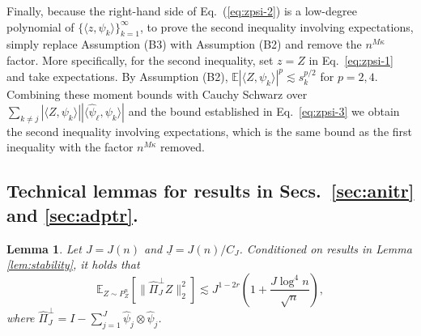 \documentclass[aos]{imsart}
\renewcommand{\hat}{\widehat}
\newcommand{\und}{\underline}
\newcommand{\pd}[1]{%
	{ \color{blue} PD: #1}%
}
\theoremstyle{plain}
\newtheorem{lemma}{Lemma}[section]
\theoremstyle{definition}
\theoremstyle{definition}
\begin{document}
\begin{appendix}
Finally, because the right-hand side of Eq.~(\ref{eq:zpsi-2}) is a low-degree polynomial of $\{\langle z,\psi_k\rangle\}_{k=1}^{\infty}$,
to prove the second inequality involving expectations, simply replace Assumption (B3) with Assumption (B2) and remove the $n^{M\kappa}$ factor. 
More specifically, {for the second inequality, set $z = Z$ in Eq.~\eqref{eq:zpsi-1} and take expectations. By Assumption (B2), $\mathbb{E}\left| \langle Z, \psi_k \rangle \right|^p \lesssim s^{p/2}_k$ for $p=2,4$. Combining these moment bounds with Cauchy Schwarz over $\sum_{k \neq j} \left| \langle Z, \psi_k \rangle \right| | \langle \hat\psi_\ell, \psi_k \rangle |$ and the bound established in Eq.~\eqref{eq:zpsi-3} we obtain the second inequality involving expectations, which is the same bound as the first inequality with the factor $n^{M\kappa}$ removed.}


\subsection{Technical lemmas for results in Secs.~\ref{sec:anitr} and \ref{sec:adptr}.}


\begin{lemma}
Let $J=J(n)$ and $\und J=J(n)/C_J$.
Conditioned on results in Lemma \ref{lem:stability}, it holds that
$$
\mathbb E_{Z\sim P_Z^n}[\|\hat\Pi_J^\perp Z\|_2^2] \lesssim J^{1-2r}\left(1+\frac{J\log^4 n}{\sqrt{n}}\right),
$$
where $\hat\Pi_{J}^\perp = I-\sum_{j=1}^{J}\hat\psi_j\otimes\hat\psi_j$.
\label{lem:truncation}
\end{lemma}


\end{appendix}
\end{document}
